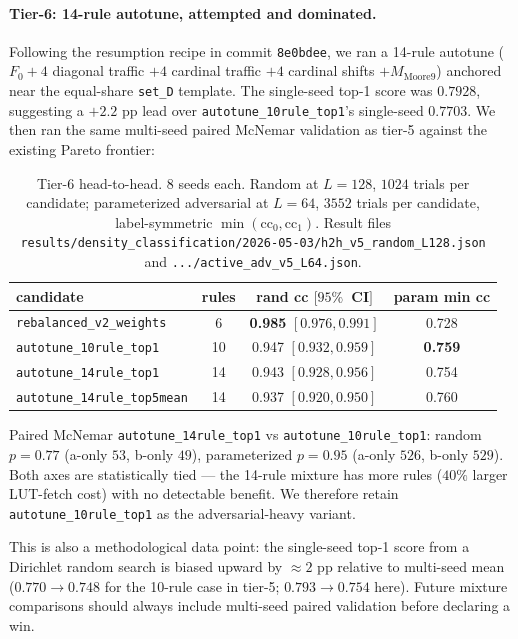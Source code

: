 \documentclass[11pt,a4paper]{article}
\newcommand{\fpath}[1]{\nolinkurl{#1}}
\begin{document}
\paragraph{Tier-6: 14-rule autotune, attempted and dominated.}
Following the resumption recipe in commit \texttt{8e0bdee}, we ran
a 14-rule autotune (\(F_0 + 4\) diagonal traffic \(+ 4\) cardinal
traffic \(+ 4\) cardinal shifts \(+ M_{\mathrm{Moore9}}\)) anchored
near the equal-share \texttt{set\_D} template.  The single-seed top-1
score was \(0.7928\), suggesting a \(+2.2\) pp lead over
\texttt{autotune\_10rule\_top1}'s single-seed
\(0.7703\).  We then ran the same multi-seed paired McNemar
validation as tier-5 against the existing Pareto frontier:
\begin{table}[h]\centering\small
\begin{tabular}{l c c c}
\toprule
candidate & rules & rand cc \([95\%\)~CI\(]\) & param min cc \\
\midrule
\texttt{rebalanced\_v2\_weights}     & 6 & \textbf{0.985} \([0.976, 0.991]\) & 0.728 \\
\texttt{autotune\_10rule\_top1}      & 10 & 0.947 \([0.932, 0.959]\) & \textbf{0.759} \\
\texttt{autotune\_14rule\_top1}      & 14 & 0.943 \([0.928, 0.956]\) & 0.754 \\
\texttt{autotune\_14rule\_top5mean}  & 14 & 0.937 \([0.920, 0.950]\) & 0.760 \\
\bottomrule
\end{tabular}
\caption{Tier-6 head-to-head.  \(8\) seeds each.  Random at
\(L=128\), \(1024\) trials per candidate; parameterized adversarial
at \(L=64\), \(3552\) trials per candidate, label-symmetric
\(\min(\mathrm{cc}_0, \mathrm{cc}_1)\).  Result files
\fpath{results/density_classification/2026-05-03/h2h_v5_random_L128.json}
and \fpath{.../active_adv_v5_L64.json}.}
\label{tab:tier-6}
\end{table}

Paired McNemar \texttt{autotune\_14rule\_top1} vs
\texttt{autotune\_10rule\_top1}: random \(p = 0.77\) (a-only \(53\),
b-only \(49\)), parameterized \(p = 0.95\) (a-only \(526\),
b-only \(529\)).  Both axes are statistically tied --- the 14-rule
mixture has more rules (\(40\%\) larger LUT-fetch cost) with no
detectable benefit.  We therefore retain
\texttt{autotune\_10rule\_top1} as the adversarial-heavy variant.

This is also a methodological data point: the single-seed top-1
score from a Dirichlet random search is biased upward by
\(\approx 2\) pp relative to multi-seed mean (\(0.770 \to 0.748\)
for the 10-rule case in tier-5; \(0.793 \to 0.754\) here).  Future
mixture comparisons should always include multi-seed paired
validation before declaring a win.
\end{document}
